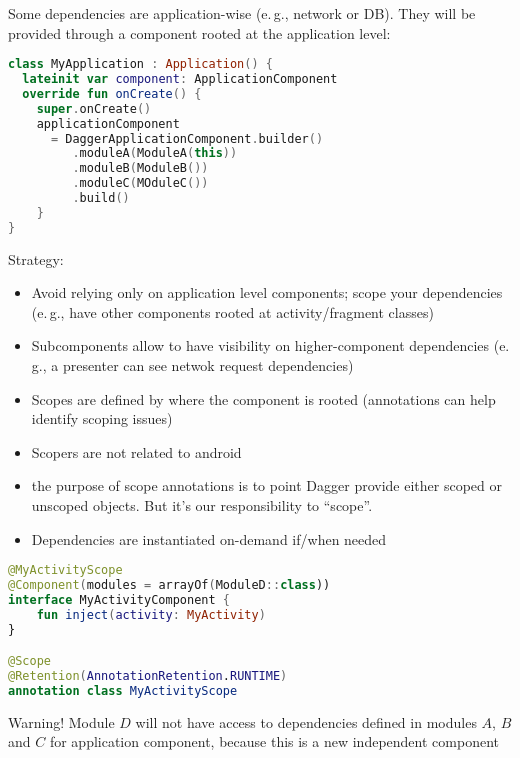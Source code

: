 \documentclass[10pt]{beamer}
\providecommand{\eg}{e.\,g.}
\begin{document}
	\begin{frame}[fragile]
		Some dependencies are application-wise (\eg, network or DB). They will be provided through a component rooted at the application level:
\begin{lstlisting}[language=Kotlin, basicstyle=\ttfamily]
class MyApplication : Application() {
  lateinit var component: ApplicationComponent
  override fun onCreate() {
    super.onCreate()
    applicationComponent 
      = DaggerApplicationComponent.builder()
         .moduleA(ModuleA(this))
         .moduleB(ModuleB())
         .moduleC(MOduleC())
         .build()
    }
}
\end{lstlisting} 
\end{frame}
\begin{frame}
	Strategy:
	\begin{itemize}
		\item Avoid relying only on application level components; scope your dependencies (\eg, have other components rooted at activity/fragment classes)
		\item Subcomponents allow to have visibility on higher-component dependencies (\eg, a presenter can see netwok request dependencies) 
		\item Scopes are defined by where the component is rooted (annotations can help identify scoping issues) 
		\item Scopers are not related to android
	\item the purpose of scope annotations is to point Dagger provide either scoped or unscoped objects. But it’s our responsibility  to ``scope''. 
		\item Dependencies are instantiated on-demand if/when needed
	\end{itemize}
\end{frame}
	\begin{frame}[fragile]
\begin{lstlisting}[language=Kotlin, basicstyle=\ttfamily]
@MyActivityScope
@Component(modules = arrayOf(ModuleD::class))
interface MyActivityComponent {
    fun inject(activity: MyActivity)
}

@Scope
@Retention(AnnotationRetention.RUNTIME)
annotation class MyActivityScope
\end{lstlisting} 
		\begin{alertblock}{Warning!}
Module $D$ will not have access to dependencies defined in modules $A$, $B$ and $C$ for application component, because this is a new independent component
		\end{alertblock}
\end{frame}
\end{document}
